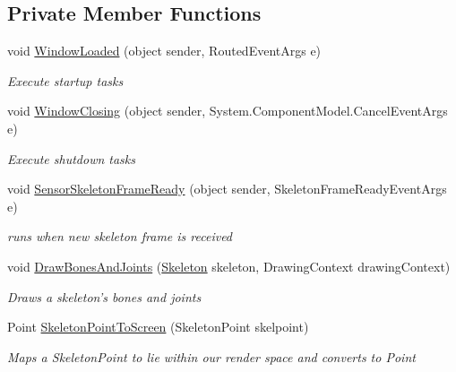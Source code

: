 \subsection*{Private Member Functions}
\begin{DoxyCompactItemize}
\item 
void \hyperlink{classUTKinectSkeletonMovementDetector_1_1MainWindow_a0bb043a0d6a0e7f767c18f277a62ff91}{Window\-Loaded} (object sender, Routed\-Event\-Args e)
\begin{DoxyCompactList}\small\item\em Execute startup tasks \end{DoxyCompactList}\item 
void \hyperlink{classUTKinectSkeletonMovementDetector_1_1MainWindow_a362d7a8479b294a0735e71eef4c9d369}{Window\-Closing} (object sender, System.\-Component\-Model.\-Cancel\-Event\-Args e)
\begin{DoxyCompactList}\small\item\em Execute shutdown tasks \end{DoxyCompactList}\item 
void \hyperlink{classUTKinectSkeletonMovementDetector_1_1MainWindow_a58bec47156e982fc810cb1a8b3aa3369}{Sensor\-Skeleton\-Frame\-Ready} (object sender, Skeleton\-Frame\-Ready\-Event\-Args e)
\begin{DoxyCompactList}\small\item\em runs when new skeleton frame is received \end{DoxyCompactList}\item 
void \hyperlink{classUTKinectSkeletonMovementDetector_1_1MainWindow_a05c77a08fa746cf27d3b2b28bed54a03}{Draw\-Bones\-And\-Joints} (\hyperlink{classUTKinectSkeletonMovementDetector_1_1MainWindow_aeaae83e3e199c75e2975b19e7f9e881e}{Skeleton} skeleton, Drawing\-Context drawing\-Context)
\begin{DoxyCompactList}\small\item\em Draws a skeleton's bones and joints \end{DoxyCompactList}\item 
Point \hyperlink{classUTKinectSkeletonMovementDetector_1_1MainWindow_ace68c6308f144ae17f084bd747fb8073}{Skeleton\-Point\-To\-Screen} (Skeleton\-Point skelpoint)
\begin{DoxyCompactList}\small\item\em Maps a Skeleton\-Point to lie within our render space and converts to Point \end{DoxyCompactList}\item 

\end{DoxyCompactItemize}
